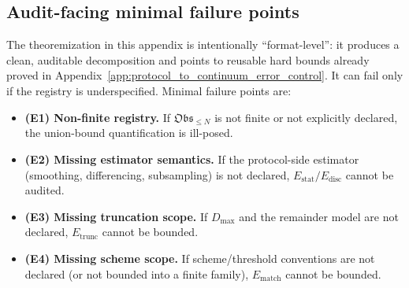 \subsection{Audit-facing minimal failure points}

\AuditTag The theoremization in this appendix is intentionally ``format-level'': it produces a clean, auditable decomposition and points to reusable hard bounds already proved in Appendix~\ref{app:protocol_to_continuum_error_control}.
It can fail only if the registry is underspecified.
Minimal failure points are:
\begin{itemize}
\item \textbf{(E1) Non-finite registry.} If $\mathfrak{Obs}_{\le N}$ is not finite or not explicitly declared, the union-bound quantification is ill-posed.
\item \textbf{(E2) Missing estimator semantics.} If the protocol-side estimator (smoothing, differencing, subsampling) is not declared, $E_{\mathrm{stat}}/E_{\mathrm{disc}}$ cannot be audited.
\item \textbf{(E3) Missing truncation scope.} If $D_{\max}$ and the remainder model are not declared, $E_{\mathrm{trunc}}$ cannot be bounded.
\item \textbf{(E4) Missing scheme scope.} If scheme/threshold conventions are not declared (or not bounded into a finite family), $E_{\mathrm{match}}$ cannot be bounded.
\end{itemize}

